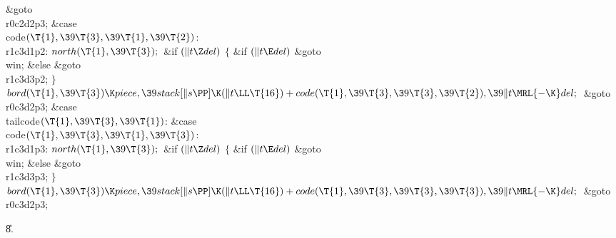 \&{goto} \\{r0c2d2p3};\6
\4\&{case} \\{code}${}(\T{1},\39\T{3},\39\T{1},\39\T{2}){}$:\5
\\{r1c3d1p2}:\5
${}\\{north}(\T{1},\39\T{3});{}$\6
\&{if} ${}(\|t\Z\\{del}){}$\5
${}\{{}$\5
\1\&{if} ${}(\|t\E\\{del}){}$\1\5
\&{goto} \\{win};\5
\2\&{else}\1\5
\&{goto} \\{r1c3d3p2};\5
\2${}\}{}$\2\6
${}\\{bord}(\T{1},\39\T{3})\K\\{piece},\39\\{stack}[\|s\PP]\K(\|t\LL\T{16})+%
\\{code}(\T{1},\39\T{3},\39\T{3},\39\T{2}),\39\|t\MRL{-{\K}}\\{del};{}$\6
\&{goto} \\{r0c3d2p3};\6
\4\&{case} \\{tailcode}${}(\T{1},\39\T{3},\39\T{1}){}$:\5
\&{case} \\{code}${}(\T{1},\39\T{3},\39\T{1},\39\T{3}){}$:\5
\\{r1c3d1p3}:\5
${}\\{north}(\T{1},\39\T{3});{}$\6
\&{if} ${}(\|t\Z\\{del}){}$\5
${}\{{}$\5
\1\&{if} ${}(\|t\E\\{del}){}$\1\5
\&{goto} \\{win};\5
\2\&{else}\1\5
\&{goto} \\{r1c3d3p3};\5
\2${}\}{}$\2\6
${}\\{bord}(\T{1},\39\T{3})\K\\{piece},\39\\{stack}[\|s\PP]\K(\|t\LL\T{16})+%
\\{code}(\T{1},\39\T{3},\39\T{3},\39\T{3}),\39\|t\MRL{-{\K}}\\{del};{}$\6
\&{goto} \\{r0c3d2p3};\par
\U8.\fi

